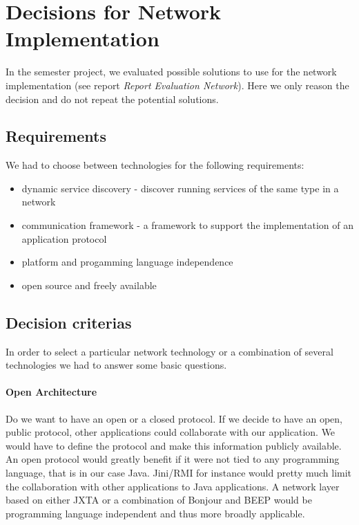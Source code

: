 \chapter{Decisions for Network Implementation}
\label{chapter:decisionsnetwork}

In the semester project, we evaluated possible solutions to use for the network implementation (see report \emph{Report Evaluation Network}). Here we only reason the decision and do not repeat the potential solutions.

\section{Requirements}
We had to choose between technologies for the following requirements:

\begin{itemize}
\item dynamic service discovery - discover running services of the same type in a network
\item communication framework - a framework to support the implementation of an application protocol
\item platform and progamming language independence
\item open source and freely available
\end{itemize}


\section{Decision criterias}
In order to select a particular network technology or a combination of several technologies we had to answer some basic questions. 

\subsubsection{Open Architecture} 
Do we want to have an open or a closed protocol. If we decide to have an open, public protocol, other applications could collaborate with our application. We would have to define the protocol and make this information publicly available. An open protocol would greatly benefit if it were not tied to any programming language, that is in our case Java. Jini/RMI for instance would pretty much limit the collaboration with other applications to Java applications. A network layer based on either JXTA or a combination of Bonjour and BEEP would be programming language independent and thus more broadly applicable. 

